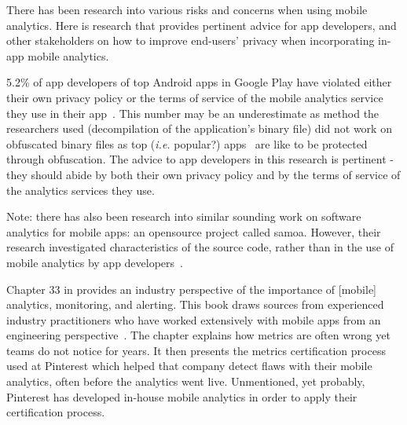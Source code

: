 There has been research into various risks and concerns when using mobile analytics. Here is research that provides pertinent advice for app developers, and other stakeholders on how to improve end-users' privacy when incorporating in-app mobile analytics.

5.2\% of app developers of top Android apps in Google Play have violated either their own privacy policy or the terms of service of the mobile analytics service they use in their app~. This number may be an underestimate as method the researchers used (decompilation of the application's binary file) did not work on obfuscated binary files as top (\emph{i.e.} popular?) apps~ are like to be protected through obfuscation. The advice to app developers in this research is pertinent - they should abide by both their own privacy policy and by the terms of service of the analytics services they use.


Note: there has also been research into similar sounding work on software analytics for mobile apps: an opensource project called \Gls{samoa}. However, their research investigated characteristics of the source code, rather than in the use of mobile analytics by app developers~.

Chapter 33 in  provides an industry perspective of the importance of [mobile] analytics, monitoring, and alerting. This book draws sources from experienced industry practitioners who have worked extensively with mobile apps from an engineering perspective~. The chapter explains how metrics are often wrong yet teams do not notice for years. It then presents the metrics certification process used at Pinterest which helped that company detect flaws with their mobile analytics, often before the analytics went live. Unmentioned, yet probably, Pinterest has developed in-house mobile analytics in order to apply their certification process.

